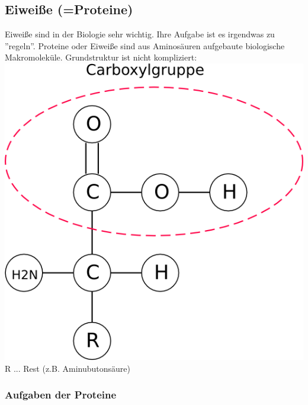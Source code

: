 \documentclass[a4paper]{article}
\begin{document}
\subsection{Eiweiße (=Proteine)}

Eiweiße sind in der Biologie sehr wichtig. Ihre Aufgabe ist es irgendwas zu ''regeln''. Proteine oder Eiweiße sind aus Aminosäuren aufgebaute biologische Makromoleküle.
\newline
\newline
Grundstruktur ist nicht kompliziert:
\newline
\newline
\includegraphics[scale=1]{image/3.png}
\newline
\newline
R ... Rest (z.B. Aminubutonsäure)
\newline
\newline
\subsubsection{Aufgaben der Proteine}
\end{document}
